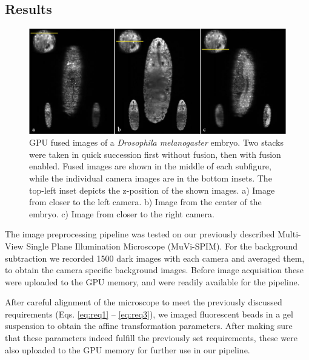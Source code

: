 
\subsection{Results}

\begin{figure}[tb]
\centering
\includegraphics[width=1\textwidth]{fusion/drosophila_D2}
\caption{ GPU fused images of a \textit{Drosophila melanogaster} embryo. Two stacks were taken in quick succession first without fusion, then with fusion enabled. Fused images are shown in the middle of each subfigure, while the individual camera images are in the bottom insets. The top-left inset depicts the z-position of the shown images. a) Image from closer to the left camera. b) Image from the center of the embryo. c) Image from closer to the right camera.}
\label{fig:drosophila}
\end{figure}

The image preprocessing pipeline was tested on our previously described Multi-View Single Plane Illumination Microscope (MuVi-SPIM)\cite{krzic_multiview_2012}. For the background subtraction we recorded 1500 dark images with each camera and averaged them, to obtain the camera specific background images. Before image acquisition these were uploaded to the GPU memory, and were readily available for the pipeline.

After careful alignment of the microscope to meet the previously discussed requirements (Eqs. \eqref{eq:req1} -- \eqref{eq:req3}), we imaged fluorescent beads in a gel suspension to obtain the affine transformation parameters. After making sure that these parameters indeed fulfill the previously set requirements, these were also uploaded to the GPU memory for further use in our pipeline.

